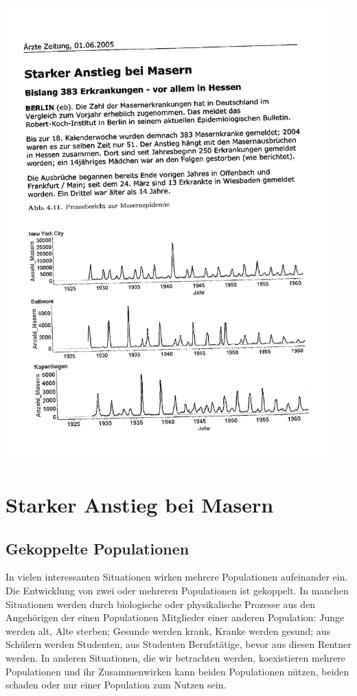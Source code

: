 \documentclass[%
11pt,%
twoside,%
titlepage,%
german,%
headsepline%
]{scrartcl}
\begin{document}
\includegraphics[width=0.93\textwidth,page=1,angle=-1.6]{pictures/starkeranstiegzeitung.pdf}

\pagebreak

\section{Starker Anstieg bei Masern}
\subsection{Gekoppelte Populationen}
In
vielen interessanten Situationen wirken mehrere Populationen aufeinander ein. Die
Entwicklung von zwei oder mehreren Populationen ist gekoppelt. In manchen Situationen werden durch biologische oder physikalische Prozesse aus den Angehörigen der einen Populationen Mitglieder einer anderen Population: Junge werden alt, Alte sterben; Gesunde werden krank, Kranke werden gesund; aus Schülern werden Studenten, aus Studenten Berufstätige, bevor aus diesen Rentner werden. In anderen Situationen, die wir betrachten werden, koexistieren mehrere Populationen und ihr Zusammenwirken kann beiden Populationen nützen, beiden schaden oder nur einer Population zum Nutzen sein.
\end{document}
